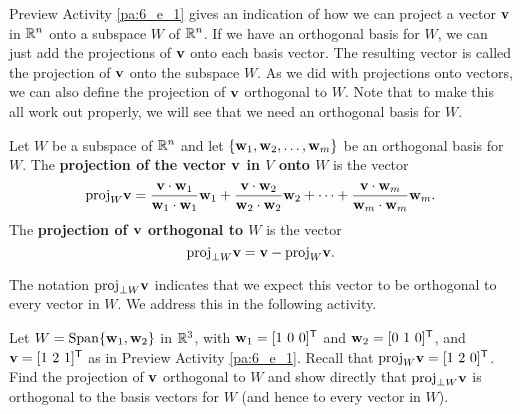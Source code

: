 
Preview Activity \ref{pa:6_e_1} gives an indication of how we can project a vector $\mathbf{v}$ in $\mathbb{R}^n$ onto a subspace $W$ of $\mathbb{R}^n$. If we have an orthogonal basis for $W$, we can just add the projections of $\mathbf{v}$ onto each basis vector. The resulting vector is called the projection of $\mathbf{v}$ onto the subspace $W$. As we did with projections onto vectors, we can also define the projection of $\mathbf{v}$ orthogonal to $W$. Note that to make this all work out properly, we will see that we need an orthogonal basis for $W$. 

\begin{definition} Let $W$ be a subspace of $\mathbb{R}^n$ and let $\{\mathbf{w}_1, \mathbf{w}_2, \ldots, \mathbf{w}_m\}$ be an orthogonal basis for $W$. The \textbf{projection of the vector $\mathbf{v}$ in $V$ onto $W$} is the vector
\[\text{proj}_W \mathbf{v} = \frac{\mathbf{v} \cdot \mathbf{w}_1}{\mathbf{w}_1 \cdot \mathbf{w}_1} \mathbf{w}_1 + \frac{\mathbf{v} \cdot \mathbf{w}_2}{\mathbf{w}_2 \cdot \mathbf{w}_2}  \mathbf{w}_2 + \cdots + \frac{\mathbf{v} \cdot \mathbf{w}_m}{\mathbf{w}_m \cdot \mathbf{w}_m}  \mathbf{w}_m.\]
The \textbf{projection of $\mathbf{v}$ orthogonal to $W$} is the vector
\[\text{proj}_{\perp W} \mathbf{v} = \mathbf{v} - \text{proj}_W \mathbf{v}.\]
\end{definition}

The notation $\text{proj}_{\perp W} \mathbf{v}$ indicates that we expect this vector to be orthogonal to every vector in $W$. We address this in the following activity. 

\begin{activity} \label{act:6_e_orth_projection} Let $W = \text{Span} \{\mathbf{w}_1, \mathbf{w}_2\}$ in $\mathbb{R}^3$, with $\mathbf{w}_1=[1 \ 0 \ 0]^{\mathsf{T}}$ and $\mathbf{w}_2= [0 \ 1 \ 0]^{\mathsf{T}}$,  and  $\mathbf{v} = [1 \ 2 \ 1]^{\mathsf{T}}$ as in Preview Activity \ref{pa:6_e_1}. Recall that $\text{proj}_W \mathbf{v} =  [1 \ 2 \ 0]^{\mathsf{T}}$. Find the projection of $\mathbf{v}$ orthogonal to $W$ and show directly that $\text{proj}_{\perp W} \mathbf{v}$ is orthogonal to the basis vectors for $W$ (and hence to every vector in $W$).

\end{activity}


